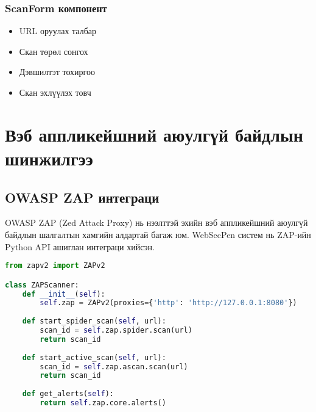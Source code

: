 \documentclass[main.tex]{subfiles}
\begin{document}
\subsubsection{ScanForm компонент}
\begin{itemize}
    \item URL оруулах талбар
    \item Скан төрөл сонгох
    \item Дэвшилтэт тохиргоо
    \item Скан эхлүүлэх товч
\end{itemize}

\section{Вэб аппликейшний аюулгүй байдлын шинжилгээ}

\subsection{OWASP ZAP интеграци}

OWASP ZAP (Zed Attack Proxy) нь нээлттэй эхийн вэб аппликейшний аюулгүй байдлын шалгалтын хамгийн алдартай багаж юм. WebSecPen систем нь ZAP-ийн Python API ашиглан интеграци хийсэн.

\begin{lstlisting}[language=Python, caption=ZAP Scanner класс]
from zapv2 import ZAPv2

class ZAPScanner:
    def __init__(self):
        self.zap = ZAPv2(proxies={'http': 'http://127.0.0.1:8080'})
    
    def start_spider_scan(self, url):
        scan_id = self.zap.spider.scan(url)
        return scan_id
    
    def start_active_scan(self, url):
        scan_id = self.zap.ascan.scan(url)
        return scan_id
    
    def get_alerts(self):
        return self.zap.core.alerts()
\end{lstlisting}
\end{document}
